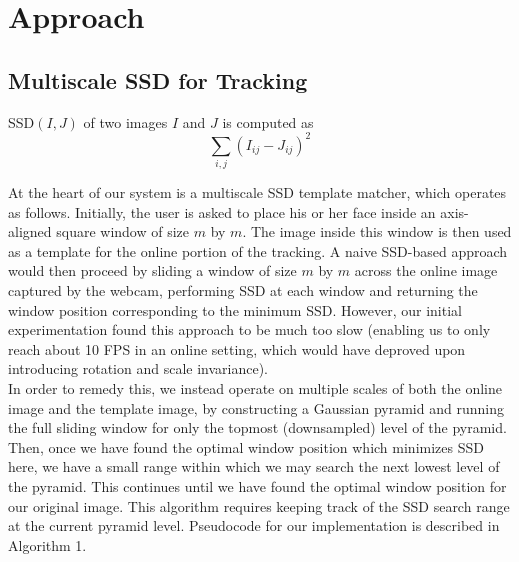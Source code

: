 \documentclass[10pt,twocolumn,letterpaper]{article}
\begin{document}
\section*{Approach}

\subsection*{Multiscale SSD for Tracking}
SSD$(I, J)$ of two images $I$ and $J$ is computed as
$$\displaystyle\sum_{i, j}(I_{ij} - J_{ij})^{2}$$

At the heart of our system is a multiscale SSD template matcher, which operates as follows.
Initially, the user is asked to place his or her face inside an axis-aligned square window of size
$m$ by $m$. The image inside this window is then used as a template for the online
portion of the tracking. A naive SSD-based approach would then proceed by sliding a window of
size $m$ by $m$ across the online image captured by the webcam, performing SSD at each window
and returning the window position corresponding to the minimum SSD. However, our initial
experimentation found this approach to be much too slow (enabling us to only reach about 10 FPS
in an online setting, which would have deproved upon introducing rotation and scale invariance).\\

In order to remedy this, we instead operate on multiple scales of both the online image and the
template image, by constructing a Gaussian pyramid \cite{gpyr} and running the full sliding window for only
the topmost (downsampled) level of the pyramid. Then, once we have found the optimal window position which
minimizes SSD here, we have a small range within which we may search the next lowest level of
the pyramid. This continues until we have found the optimal window position for our original image.
This algorithm requires keeping track of the SSD search range at the current pyramid level.
Pseudocode for our implementation is described in Algorithm 1.\\
\end{document}
